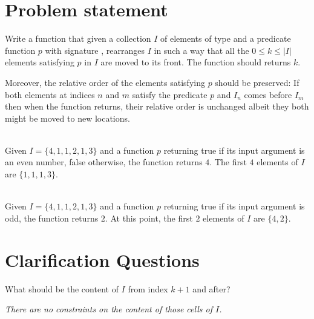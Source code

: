 \section{Problem statement}
\begin{exercise}
\label{example:remove_all_occurrences_unsorted_array_inplace:exercice1}
Write a function that given a collection $I$ of elements of type 
 and a predicate function
 $p$ with signature , rearranges $I$ in such a way that all the $0 \leq k
 \leq |I|$ elements satisfying $p$ in $I$ are moved to its front. The function should returns $k$.

 Moreover, the relative order of the elements  satisfying $p$ should be preserved: If both elements
 at indices $n$ and $m$ satisfy the predicate $p$  and $I_n$ comes before $I_m$ then when the
 function returns, their relative order is unchanged albeit they both might be moved to new
 locations.
 
	\begin{example}
		\label{example:remove_all_occurrences_unsorted_array_inplace:example1}
		\hfill \\
		Given $I = \{{4, 1, 1, 2, 1, 3\}}$ and a function $p$ returning true if its input argument is an even number, false otherwise, the function returns $4$. The first $4$ elements of $I$ are $\{1,1,1,3\}$. 
		
	\end{example}

	\begin{example}
		\label{example:remove_all_occurrences_unsorted_array_inplace:example2}
		\hfill \\
		Given $I = \{4, 1, 1, 2, 1, 3\}$ and a function $p$ returning true if its input argument is odd, the function returns $2$. At this point, the first $2$ elements of $I$ are $\{4,2\}$. 
		
	\end{example}
\end{exercise}

\section{Clarification Questions}

\begin{QandA}
	\item \begin{questionitem} \begin{question} What should be the content of $I$ from index $k+1$ and after?  \end{question} 	 
    \begin{answered}
		\textit{There are no constraints on the content of those cells of $I$.}
	\end{answered} \end{questionitem}
	
\end{QandA}

